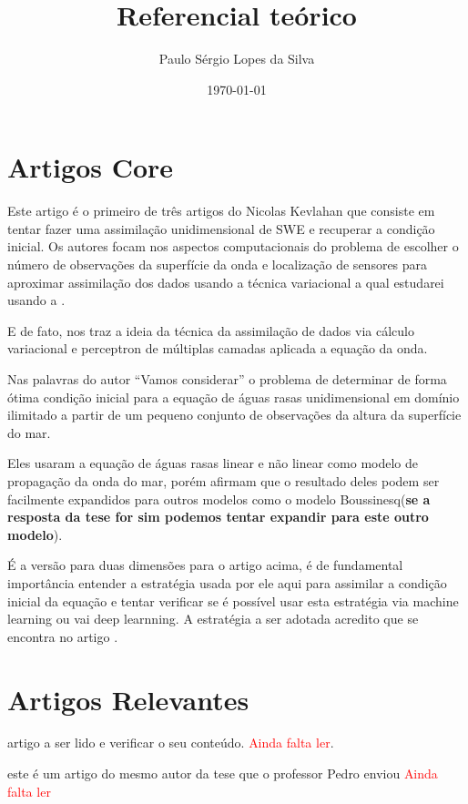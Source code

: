 \documentclass[12pt,a4paper]{article}
\author{Paulo Sérgio Lopes da Silva}
\title{Referencial teórico}
\date{\today}
\begin{document}
	
	\maketitle
	\section{Artigos Core}
	\cite{kevlahan2019convergence} Este artigo é o primeiro de três artigos do Nicolas Kevlahan que consiste em tentar fazer uma assimilação unidimensional de SWE e recuperar a condição inicial. Os autores focam nos aspectos computacionais do problema de  escolher o número de observações da superfície da onda  e localização de sensores para aproximar assimilação dos dados usando a técnica variacional a qual estudarei usando a \cite{furtado2012data}.
	
	E de fato, \cite{furtado2012data} nos traz a ideia da técnica da assimilação de dados via cálculo variacional e perceptron de múltiplas camadas aplicada a equação da onda.
	
	Nas palavras do autor ``Vamos considerar'' o problema de determinar de forma ótima  condição inicial para a equação de águas rasas unidimensional em domínio ilimitado a partir de um pequeno conjunto de observações da altura da superfície do mar.
	
	Eles usaram a equação de águas rasas linear e não linear como modelo de propagação da onda do mar, porém afirmam que o resultado deles podem ser facilmente expandidos para outros modelos como o modelo Boussinesq(\textbf{se a resposta da tese for sim podemos tentar expandir para este outro modelo}).
	
	
	\cite{khan2022data} É a versão para duas dimensões para o artigo acima, é de fundamental importância entender a estratégia usada por ele aqui para assimilar a condição inicial da equação e tentar verificar se é possível usar esta estratégia via machine learning ou vai deep learnning. A estratégia a ser adotada acredito que se encontra no artigo \cite{ghorbani2023data}.
	
	
	\section{Artigos Relevantes}
	
	\cite{kochkov2023neural} artigo a ser lido e verificar o seu conteúdo. \textcolor{red}{Ainda falta ler}.
	
	\cite{artigo2021fabioamaral} este é um artigo do mesmo autor da tese que o professor Pedro enviou \textcolor{red}{Ainda falta ler}
	
\end{document}
